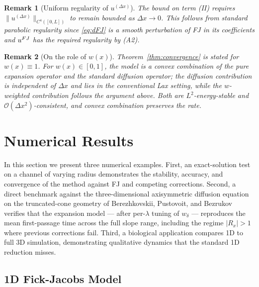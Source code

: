 \documentclass[11pt]{article}
\newtheorem{remark}{Remark}
\begin{document}
\begin{remark}[Uniform regularity of $u^{(\Delta x)}$]\label{rem:uniform-regularity}
    The bound on term (II) requires $\|u^{(\Delta x)}\|_{C^4([0,L])}$ to remain bounded as $\Delta x \to 0$. This follows from standard parabolic regularity since \eqref{eq:dFJ} is a smooth perturbation of FJ in its coefficients and $u^{\rm FJ}$ has the required regularity by (A2).
\end{remark}

\begin{remark}[On the role of $w(x)$]
    Theorem~\ref{thm:convergence} is stated for $w(x) \equiv 1$. For $w(x) \in [0, 1]$, the model is a convex combination of the pure expansion operator and the standard diffusion operator; the diffusion contribution is independent of $\Delta x$ and lies in the conventional Lax setting, while the $w$-weighted contribution follows the argument above. Both are $L^2$-energy-stable and $\mathcal{O}(\Delta x^2)$-consistent, and convex combination preserves the rate.
\end{remark}



\section{Numerical Results}\label{sec:numerical-results}

In this section we present three numerical examples. First, an exact-solution test on a channel of varying radius demonstrates the stability, accuracy, and convergence of the method against FJ and competing corrections. Second, a direct benchmark against the three-dimensional axisymmetric diffusion equation on the truncated-cone geometry of Berezhkovskii, Pustovoit, and Bezrukov \cite{BPB2007} verifies that the expansion model --- after per-$\lambda$ tuning of $w_\delta$ --- reproduces the mean first-passage time across the full slope range, including the regime $|R_x| > 1$ where previous corrections fail. Third, a biological application compares 1D to full 3D simulation, demonstrating qualitative dynamics that the standard 1D reduction misses.


\subsection{1D Fick-Jacobs Model}
\end{document}
